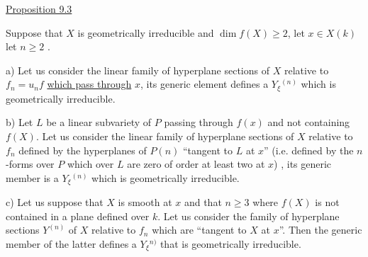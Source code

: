 \documentclass[11pt]{article}
\newcommand{\scanpage}[1]{\par\bigskip\noindent{\small\sffamily[scan #1]}\par}
\newcommand{\mspage}[1]{{\small\sffamily[p.\,#1]}}
\newcommand{\uline}[1]{\underline{#1}}
\begin{document}
\uline{Proposition 9.3}

Suppose that $X$ is geometrically irreducible and $\dim f(X) \geq 2$,
let $x \in X(k)$ let $n \geq 2$ .

a) Let us consider the linear family of hyperplane sections
of $X$ relative to $f_n =u_nf$ \uline{which pass through} $x$, its generic element
defines a $Y_\xi{}^{(n)}$ which is geometrically irreducible.

b) Let $L$ be a linear subvariety of $P$ passing through $f(x)$ and
not containing $f(X)$.  Let us consider the linear family of
hyperplane sections of $X$ relative to $f_n$ defined by the hyperplanes
of $P(n)$ ``tangent to $L$ at $x$'' (i.e. defined by the $n$-forms over $P$
which over $L$ are zero of order at least two at $x$) , its generic
member is a $Y_\xi{}^{(n)}$ which is geometrically irreducible.

c) Let us suppose that $X$ is smooth at $x$ and that $n \geq 3$ where
$f(X)$ is not contained in a plane defined over $k$.  Let us consider
the family of hyperplane sections $Y^{(n)}$ of $X$ relative to $f_n$ which
are ``tangent to $X$ at $x$''.  Then the generic member of the latter
defines a $Y_\xi{}^{n)}$ that is geometrically irreducible.

\clearpage
\scanpage{24/65}
\mspage{65}
\end{document}
